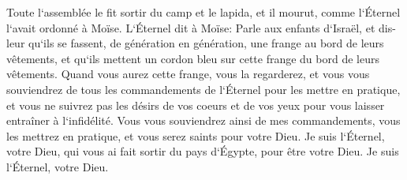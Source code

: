 \verse Toute l`assemblée le fit sortir du camp et le lapida, et il mourut, comme l`Éternel l`avait ordonné à Moïse. 
\verse L`Éternel dit à Moïse: 
\verse Parle aux enfants d`Israël, et dis-leur qu`ils se fassent, de génération en génération, une frange au bord de leurs vêtements, et qu`ils mettent un cordon bleu sur cette frange du bord de leurs vêtements. 
\verse Quand vous aurez cette frange, vous la regarderez, et vous vous souviendrez de tous les commandements de l`Éternel pour les mettre en pratique, et vous ne suivrez pas les désirs de vos coeurs et de vos yeux pour vous laisser entraîner à l`infidélité. 
\verse Vous vous souviendrez ainsi de mes commandements, vous les mettrez en pratique, et vous serez saints pour votre Dieu. 
\verse Je suis l`Éternel, votre Dieu, qui vous ai fait sortir du pays d`Égypte, pour être votre Dieu. Je suis l`Éternel, votre Dieu. 

\chapter{}


